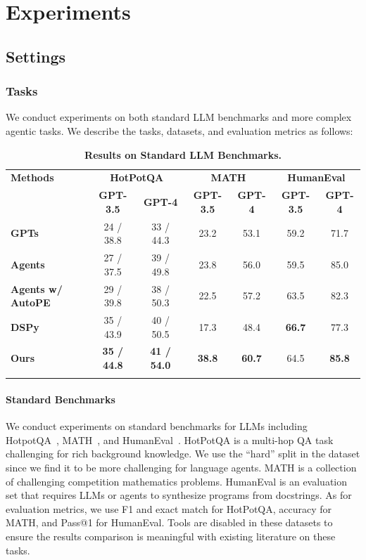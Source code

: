\documentclass{article}
\begin{document}
\section{Experiments}

\subsection{Settings}

\subsubsection{Tasks}
We conduct experiments on both standard LLM benchmarks and more complex agentic tasks. We describe the tasks, datasets, and evaluation metrics as follows:


\begin{table}[htb]
  \centering
      \caption{\textbf{Results on Standard LLM Benchmarks.}}
      \label{tab:benchmark_results}
\renewcommand\tabcolsep{8pt}
\renewcommand\arraystretch{1.2}
  \begin{tabular}{l|cc|cc|cc} 
\Xhline{1.5pt}
\textbf{Methods} & \multicolumn{2}{c|}{\textbf{HotPotQA}} & \multicolumn{2}{c|}{\textbf{MATH}} & \multicolumn{2}{c}{\textbf{HumanEval}} \\
                 & \textbf{GPT-3.5}  & \textbf{GPT-4} & \textbf{GPT-3.5}  & \textbf{GPT-4} & \textbf{GPT-3.5}  & \textbf{GPT-4} \\
\Xhline{1.5pt}
\bf GPTs &   24 / 38.8 & 33 / 44.3  & 23.2 & 53.1 & 59.2  &  71.7 \\
\bf Agents  & 27 / 37.5 & 39 / 49.8  & 23.8 & 56.0 & 59.5 & 85.0 \\
\bf Agents w/ AutoPE & 29 / 39.8 & 38 / 50.3  & 22.5  & 57.2  & 63.5  &  82.3 \\
\bf DSPy & 35 / 43.9 & 40 / 50.5  & 17.3 & 48.4 & \bf 66.7  & 77.3 \\ \hline

\bf Ours  & \bf 35 / 44.8 & \bf 41 / 54.0  & \bf 38.8  & \bf 60.7  & 64.5  & \bf 85.8   \\ \hline
\Xhline{1.5pt}
\end{tabular}
\end{table}
\vspace{-10pt}



\paragraph{Standard Benchmarks}
We conduct experiments on standard benchmarks for LLMs including HotpotQA~\citep{yang-etal-2018-hotpotqa}, MATH~\citep{hendrycksmath2021}, and HumanEval~\citep{chen2021codex}. HotPotQA is a multi-hop QA task challenging for rich background knowledge. We use the ``hard'' split in the dataset since we find it to be more challenging for language agents. MATH is a collection of challenging competition mathematics problems. HumanEval is an evaluation set that requires LLMs or agents to synthesize programs from docstrings. As for evaluation metrics, we use F1 and exact match for HotPotQA, accuracy for MATH, and Pass@1 for HumanEval. Tools are disabled in these datasets to ensure the results comparison is meaningful with existing literature on these tasks. 
\end{document}
